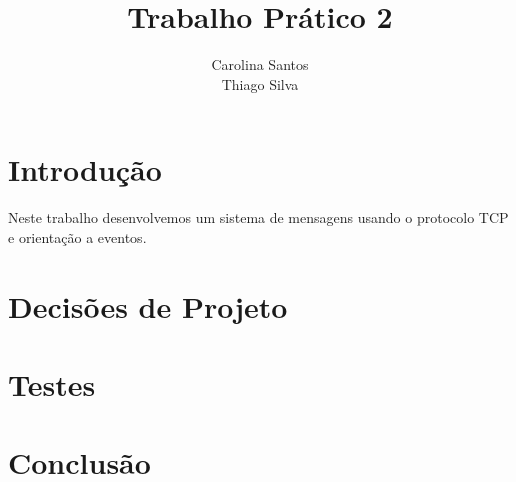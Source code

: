 \documentclass[11pt]{article}
\title{\textbf{Trabalho Prático 2}}
\author{Carolina Santos\\
		Thiago Silva}
\date{}
\begin{document}
\maketitle

\section{Introdução}
Neste trabalho desenvolvemos um sistema de mensagens usando o protocolo TCP e orientação a eventos.


\section{Decisões de Projeto}


\section{Testes}


\section{Conclusão}
\end{document}
